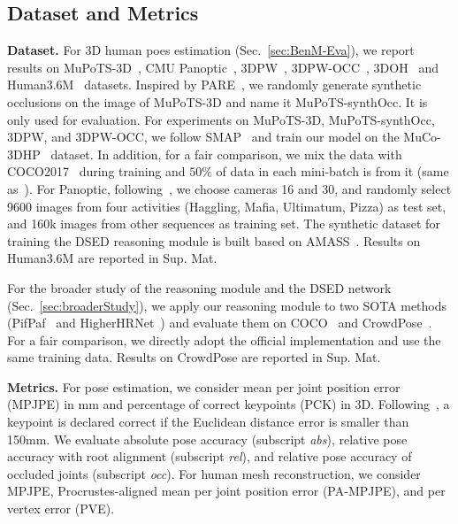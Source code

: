 \subsection{Dataset and Metrics}
\noindent\textbf{Dataset.}
For 3D human poes estimation (Sec.~\ref{sec:BenM-Eva}), we report results on MuPoTS-3D~\cite{mehta2018single}, CMU Panoptic~\cite{joo2015panoptic}, 3DPW~\cite{von2018recovering}, 3DPW-OCC~\cite{von2018recovering,zhang2020object}, 3DOH~\cite{zhang2020object} and Human3.6M~\cite{ionescu2013human3} datasets. Inspired by PARE~\cite{kocabas2021pare}, we randomly generate synthetic occlusions on the image of MuPoTS-3D and name it MuPoTS-synthOcc. It is only used for evaluation. For experiments on MuPoTS-3D, MuPoTS-synthOcc, 3DPW, and 3DPW-OCC, we follow SMAP~\cite{zhen2020smap} and train our model on the MuCo-3DHP~\cite{mehta2018single} dataset. In addition, for a fair comparison, we mix the data with COCO2017~\cite{lin2014microsoft} during training and $50\%$ of data in each mini-batch is from it (same as~\cite{mehta2018single,mehta2017vnect,zhen2020smap}). For Panoptic, following~\cite{zanfir2018monocular,zhen2020smap}, we choose cameras 16 and 30, and randomly select 9600 images from four activities (Haggling, Mafia, Ultimatum, Pizza) as test set, and 160k images from other sequences as training set. The synthetic dataset for training the DSED reasoning module is built based on AMASS~\cite{mahmood2019amass}. Results on Human3.6M are reported in Sup. Mat.

For the broader study of the reasoning module and the DSED network (Sec.~\ref{sec:broaderStudy}), we apply our reasoning module to two SOTA methods (PifPaf~\cite{kreiss2019pifpaf} and  HigherHRNet~\cite{cheng2020higherhrnet}) and evaluate them on COCO~\cite{lin2014microsoft} and CrowdPose~\cite{li2019crowdpose}. For a fair comparison, we directly adopt the official implementation and use the same training data. Results on CrowdPose are reported in Sup. Mat.

\noindent\textbf{Metrics.}
For pose estimation, we consider mean per joint position error (MPJPE) in mm and percentage of correct keypoints (PCK) in 3D. Following~\cite{zhen2020smap}, a keypoint is declared correct if the Euclidean distance error is smaller than 150mm. We evaluate absolute pose accuracy (subscript \textit{abs}), relative pose accuracy with root alignment (subscript \textit{rel}), and relative pose accuracy of occluded joints (subscript \textit{occ}). For human mesh reconstruction, we consider MPJPE, Procrustes-aligned mean per joint position error (PA-MPJPE), and per vertex error (PVE).

